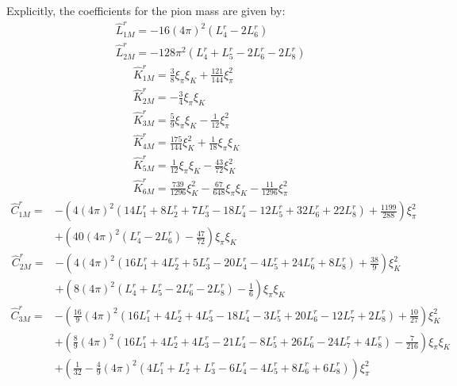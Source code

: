 \documentclass[12pt,a4paper]{article}
\begin{document}
Explicitly, the coefficients for the pion mass are given by:
\begin{align}
	& \hat{L}^r_{1M} = -16 (4 \pi )^2 (L^r_4-2L^r_6) \nonumber \\
	& \hat{L}^r_{2M} = -128 \pi ^2 (L^r_4+L^r_5-2 L^r_6-2 L^r_8)
\end{align}
\begin{align}
	& \hat{K}^r_{1M} = \frac{3}{8} \xi _{\pi} \xi_K + \frac{121}{144} \xi _{\pi }^2 \nonumber \\
	& \hat{K}^r_{2M} = -\frac{3}{4} \xi _{\pi} \xi_K \nonumber \\
	& \hat{K}^r_{3M} = \frac{5}{9} \xi _{\pi} \xi_K - \frac{1}{12} \xi _{\pi }^2 \nonumber \\
	& \hat{K}^r_{4M} = \frac{175}{144} \xi _K^2 + \frac{1}{18}\xi _{\pi } \xi _K \nonumber \\
	& \hat{K}^r_{5M} = \frac{1}{12} \xi _{\pi } \xi _K - \frac{43}{72} \xi _K^2 \nonumber \\
	& \hat{K}^r_{6M} = \frac{739}{1296} \xi _K^2 - \frac{67}{648} \xi _{\pi } \xi _K - \frac{11}{1296} \xi _{\pi }^2
\end{align}
\begin{align*}
	\hat{C}^r_{1M} =&  - \left(4(4 \pi )^2 (14 L^r_{1}+8 L^r_{2}+7 L^r_{3}-18 L^r_{4}-12 L^r_{5}+32 L^r_{6}+22 L^r_{8}) + \frac{1199}{288}\right) \xi_{\pi}^2\nonumber \\
	&  + \left(40 (4 \pi )^2 (L^r_{4}-2 L^r_{6})-\frac{47}{72}\right) \xi_{\pi } \xi_K
\end{align*}
\begin{align*}
	\hat{C}^r_{2M} =& - \left(4 (4 \pi )^2 (16 L^r_{1}+4 L^r_{2}+5 L^r_{3}-20 L^r_{4}-4 L^r_{5}+24 L^r_{6}+8 L^r_{8})+\frac{38}{9}\right) \xi_K^2 \nonumber \\
	& + \left(8 (4 \pi )^2 (L^r_{4}+L^r_{5}-2 L^r_{6}-2 L^r_{8})-\frac{1}{6}\right) \xi_{\pi } \xi_K	
\end{align*}
\begin{align*}
	\hat{C}^r_{3M} =& -\left(\frac{16}{9} (4 \pi )^2 (16 L^r_{1}+4 L^r_{2}+4 L^r_{3}-18 L^r_{4}-3 L^r_{5}+20 L^r_{6}-12 L^r_{7}+2 L^r_{8})+\frac{10}{27}\right) \xi _K^2  \nonumber \\
	& + \left(\frac{8}{9} (4 \pi )^2 (16 L^r_{1}+4 L^r_{2}+4 L^r_{3}-21 L^r_{4}-8 L^r_{5}+26 L^r_{6}-24 L^r_{7}+4 L^r_{8})-\frac{7}{216}\right) \xi_{\pi } \xi _K  \nonumber \\
	& + \left(\frac{1}{32}-\frac{4}{9} (4 \pi )^2 (4 L^r_{1}+L^r_{2}+L^r_{3}-6 L^r_{4}-4 L^r_{5}+8 L^r_{6}+6 L^r_{8})\right) \xi_{\pi}^2
\end{align*}
\end{document}
